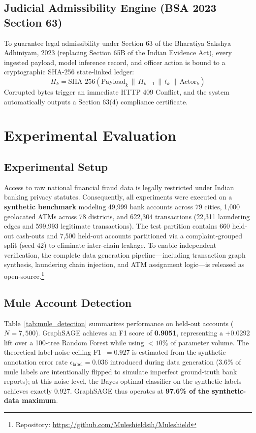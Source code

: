 \documentclass[conference]{IEEEtran}
\begin{document}
\subsection{Judicial Admissibility Engine (BSA 2023 Section 63)}
To guarantee legal admissibility under Section 63 of the Bharatiya Sakshya Adhiniyam, 2023 \cite{bsa2023} (replacing Section 65B of the Indian Evidence Act), every ingested payload, model inference record, and officer action is bound to a cryptographic SHA-256 state-linked ledger:
\begin{equation}
H_k = \text{SHA-256}\left( \text{Payload}_k \,\|\, H_{k-1} \,\|\, t_k \,\|\, \text{Actor}_k \right)
\end{equation}
Corrupted bytes trigger an immediate HTTP 409 Conflict, and the system automatically outputs a Section 63(4) compliance certificate.

\section{Experimental Evaluation}

\subsection{Experimental Setup}
Access to raw national financial fraud data is legally restricted under Indian banking privacy statutes. Consequently, all experiments were executed on a \textbf{synthetic benchmark} modeling 49,999 bank accounts across 79 cities, 1,000 geolocated ATMs across 78 districts, and 622,304 transactions (22,311 laundering edges and 599,993 legitimate transactions). The test partition contains 660 held-out cash-outs and 7,500 held-out accounts partitioned via a complaint-grouped split (seed 42) to eliminate inter-chain leakage. To enable independent verification, the complete data generation pipeline---including transaction graph synthesis, laundering chain injection, and ATM assignment logic---is released as open-source.\footnote{Repository: \url{https://github.com/Muleshieldsih/Muleshield}}

\subsection{Mule Account Detection}
Table~\ref{tab:mule_detection} summarizes performance on held-out accounts ($N=7,500$). GraphSAGE achieves an F1 score of \textbf{0.9051}, representing a +0.0292 lift over a 100-tree Random Forest while using $<10\%$ of parameter volume. The theoretical label-noise ceiling F1~$= 0.927$ is estimated from the synthetic annotation error rate $\epsilon_{\text{label}} = 0.036$ introduced during data generation (3.6\% of mule labels are intentionally flipped to simulate imperfect ground-truth bank reports); at this noise level, the Bayes-optimal classifier on the synthetic labels achieves exactly 0.927. GraphSAGE thus operates at \textbf{97.6\% of the synthetic-data maximum}.
\end{document}
